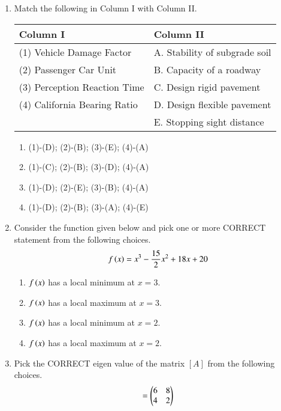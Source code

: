 \documentclass[journal,12pt,onecolumn]{article}
\theoremstyle{remark}
\begin{document}
\begin{enumerate}
    \item Match the following in Column I with Column II.
    \begin{center}
    \begin{tabular}{|l|l|}
        \hline
        \textbf{Column I} & \textbf{Column II} \\
        \hline
        (1) Vehicle Damage Factor & A. Stability of subgrade soil \\
        (2) Passenger Car Unit & B. Capacity of a roadway \\
        (3) Perception Reaction Time & C. Design rigid pavement \\
        (4) California Bearing Ratio & D. Design flexible pavement \\
        & E. Stopping sight distance \\
        \hline
    \end{tabular}
    \end{center}

    \hfill{}
    \begin{enumerate}
        \item (1)-(D); (2)-(B); (3)-(E); (4)-(A)
        \item (1)-(C); (2)-(B); (3)-(D); (4)-(A)
        \item (1)-(D); (2)-(E); (3)-(B); (4)-(A)
        \item (1)-(D); (2)-(B); (3)-(A); (4)-(E)
    \end{enumerate}

    \item Consider the function given below and pick one or more CORRECT statement from the following choices.
    \begin{align} 
    f\left(x\right) = x^3 - \frac{15}{2}x^2 + 18x + 20 
    \end{align}

    \hfill{}
    \begin{enumerate}
        \item $f\left(x\right)$ has a local minimum at $x=3$.
        \item $f\left(x\right)$ has a local maximum at $x=3$.
        \item $f\left(x\right)$ has a local minimum at $x=2$.
        \item $f\left(x\right)$ has a local maximum at $x=2$.
    \end{enumerate}

    \item Pick the CORRECT eigen value of the matrix $[A]$ from the following choices.
    \begin{align}
    [A] = \myvec{6 & 8 \\ 4 & 2} 
    \end{align}


\end{enumerate}
\end{document}
